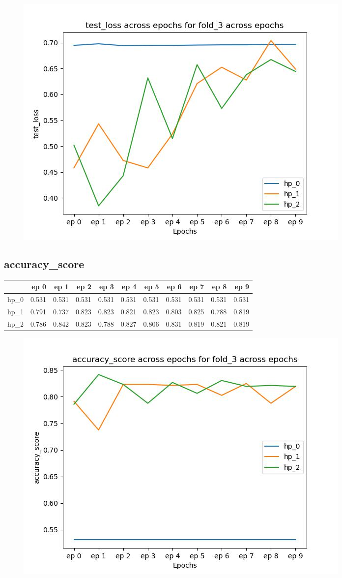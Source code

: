 \documentclass{article}
\begin{document}
\begin{figure}[H]
\includegraphics[scale = 0.75]{fold_3/test_loss}
\end{figure}
\subsection{accuracy\_score}
\begin{tabular}{lrrrrrrrrrr}
\toprule
{} &   ep 0 &   ep 1 &   ep 2 &   ep 3 &   ep 4 &   ep 5 &   ep 6 &   ep 7 &   ep 8 &   ep 9 \\
\midrule
hp\_0 &  0.531 &  0.531 &  0.531 &  0.531 &  0.531 &  0.531 &  0.531 &  0.531 &  0.531 &  0.531 \\
hp\_1 &  0.791 &  0.737 &  0.823 &  0.823 &  0.821 &  0.823 &  0.803 &  0.825 &  0.788 &  0.819 \\
hp\_2 &  0.786 &  0.842 &  0.823 &  0.788 &  0.827 &  0.806 &  0.831 &  0.819 &  0.821 &  0.819 \\
\bottomrule
\end{tabular}

\begin{figure}[H]
\includegraphics[scale = 0.75]{fold_3/accuracy_score}
\end{figure}
\end{document}
